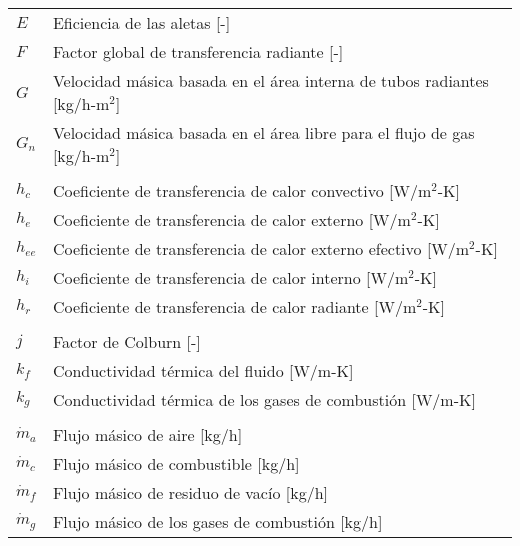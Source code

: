 \begin{tabular}{ll}
$E$   & Eficiencia de las aletas [-]\\
$F$   & Factor global de transferencia radiante [-]\\
$G$   & Velocidad másica basada en el área interna de tubos radiantes [kg/h-m$^2$]\\
$G_n$ & Velocidad másica basada en el área libre para el flujo de gas [kg/h-m$^2$]\\
\\
$h_{c}$ & Coeficiente de transferencia de calor convectivo [W/m$^2$-K]\\
$h_{e}$ & Coeficiente de transferencia de calor externo [W/m$^2$-K]\\
$h_{ee}$& Coeficiente de transferencia de calor externo efectivo [W/m$^2$-K]\\
$h_{i}$ & Coeficiente de transferencia de calor interno [W/m$^2$-K]\\
$h_{r}$ & Coeficiente de transferencia de calor radiante [W/m$^2$-K]\\
\\
$j$     & Factor de Colburn [-] \\
$k_f$   & Conductividad térmica del fluido [W/m-K] \\
$k_g$   & Conductividad térmica de los gases de combustión [W/m-K] \\
\\
$\dot m_a$  & Flujo másico de aire [kg/h] \\
$\dot m_c$  & Flujo másico de combustible [kg/h] \\
$\dot m_f$  & Flujo másico de residuo de vacío [kg/h] \\
$\dot m_g$  & Flujo másico de los gases de combustión [kg/h] \\
\end{tabular}


